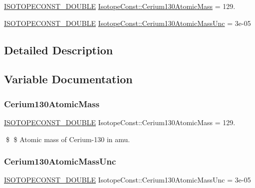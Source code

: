 \begin{DoxyCompactItemize}
\item 
\mbox{\hyperlink{group___isotope_const-_macros_ga8f45a7272ce02c0b4c65c44636ed719a}{I\+S\+O\+T\+O\+P\+E\+C\+O\+N\+S\+T\+\_\+\+D\+O\+U\+B\+LE}} \mbox{\hyperlink{group___isotope_const-_cerium-_ce130_gaa2158a95cf4850941aa9ee99ef80ba9c}{Isotope\+Const\+::\+Cerium130\+Atomic\+Mass}} = 129.
\item 
\mbox{\hyperlink{group___isotope_const-_macros_ga8f45a7272ce02c0b4c65c44636ed719a}{I\+S\+O\+T\+O\+P\+E\+C\+O\+N\+S\+T\+\_\+\+D\+O\+U\+B\+LE}} \mbox{\hyperlink{group___isotope_const-_cerium-_ce130_gac1781ce0bce2962fcbb7d5a51a1fc6c3}{Isotope\+Const\+::\+Cerium130\+Atomic\+Mass\+Unc}} = 3e-\/05
\end{DoxyCompactItemize}


\subsection{Detailed Description}


\subsection{Variable Documentation}
\mbox{\label{group___isotope_const-_cerium-_ce130_gaa2158a95cf4850941aa9ee99ef80ba9c}} 
\subsubsection{\texorpdfstring{Cerium130\+Atomic\+Mass}{Cerium130AtomicMass}}
{\footnotesize\ttfamily \mbox{\hyperlink{group___isotope_const-_macros_ga8f45a7272ce02c0b4c65c44636ed719a}{I\+S\+O\+T\+O\+P\+E\+C\+O\+N\+S\+T\+\_\+\+D\+O\+U\+B\+LE}} Isotope\+Const\+::\+Cerium130\+Atomic\+Mass = 129.}

\$ \$ Atomic mass of Cerium-\/130 in amu. \mbox{\label{group___isotope_const-_cerium-_ce130_gac1781ce0bce2962fcbb7d5a51a1fc6c3}} 
\subsubsection{\texorpdfstring{Cerium130\+Atomic\+Mass\+Unc}{Cerium130AtomicMassUnc}}
{\footnotesize\ttfamily \mbox{\hyperlink{group___isotope_const-_macros_ga8f45a7272ce02c0b4c65c44636ed719a}{I\+S\+O\+T\+O\+P\+E\+C\+O\+N\+S\+T\+\_\+\+D\+O\+U\+B\+LE}} Isotope\+Const\+::\+Cerium130\+Atomic\+Mass\+Unc = 3e-\/05}

